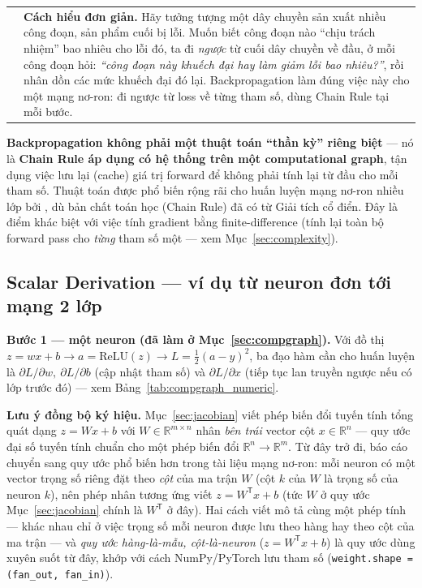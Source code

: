 \documentclass[12pt,a4paper]{report}
\makeatletter
\newenvironment{tructiep}[1][Cách hiểu đơn giản]
  {\par\smallskip\noindent\begin{tabular}{@{}p{0.35em}@{\hspace{6pt}}p{\dimexpr\linewidth-1.9em\relax}@{}}
   \textcolor{boxln}{\rule{2pt}{\baselineskip}} & \textbf{#1.}\enspace\ignorespaces}
  {\end{tabular}\par\smallskip}
\newcommand{\T}{^{\mathsf{T}}}
\makeatother
\begin{document}
\begin{tructiep}
Hãy tưởng tượng một dây chuyền sản xuất nhiều công đoạn, sản phẩm cuối bị
lỗi. Muốn biết công đoạn nào ``chịu trách nhiệm'' bao nhiêu cho lỗi đó, ta đi
\emph{ngược} từ cuối dây chuyền về đầu, ở mỗi công đoạn hỏi: \emph{``công
đoạn này khuếch đại hay làm giảm lỗi bao nhiêu?''}, rồi nhân dồn các mức
khuếch đại đó lại. Backpropagation làm đúng việc này cho một mạng nơ-ron:
đi ngược từ loss về từng tham số, dùng Chain Rule tại mỗi bước.
\end{tructiep}

\textbf{Backpropagation không phải một thuật toán ``thần kỳ'' riêng biệt} ---
nó là \textbf{Chain Rule áp dụng có hệ thống trên một computational graph},
tận dụng việc lưu lại (cache) giá trị forward để không phải tính lại từ
đầu cho mỗi tham số. Thuật toán được phổ biến rộng rãi cho huấn luyện mạng
nơ-ron nhiều lớp bởi \citet{rumelhart1986learning}, dù bản chất toán học
(Chain Rule) đã có từ Giải tích cổ điển. Đây là điểm khác biệt với việc
tính gradient bằng finite-difference (tính lại toàn bộ forward pass cho
\emph{từng} tham số một --- xem Mục~\ref{sec:complexity}).

\subsection{Scalar Derivation --- ví dụ từ neuron đơn tới mạng 2 lớp}
\label{sec:scalar}

\textbf{Bước 1 --- một neuron (đã làm ở Mục~\ref{sec:compgraph}).} Với đồ
thị $z=wx+b \to a=\mathrm{ReLU}(z) \to L=\tfrac12(a-y)^2$, ba đạo hàm cần
cho huấn luyện là $\partial L/\partial w,\ \partial L/\partial b$ (cập nhật
tham số) và $\partial L/\partial x$ (tiếp tục lan truyền ngược nếu có lớp
trước đó) --- xem Bảng~\ref{tab:compgraph_numeric}.

\textbf{Lưu ý đồng bộ ký hiệu.} Mục~\ref{sec:jacobian} viết phép biến đổi
tuyến tính tổng quát dạng $z=Wx+b$ với $W\in\mathbb R^{m\times n}$ nhân
\emph{bên trái} vector cột $x\in\mathbb R^n$ --- quy ước đại số tuyến tính
chuẩn cho một phép biến đổi $\mathbb R^n\to\mathbb R^m$. Từ đây trở đi,
báo cáo chuyển sang quy ước phổ biến hơn trong tài liệu mạng nơ-ron: mỗi
neuron có một vector trọng số riêng đặt theo \emph{cột} của ma trận $W$
(cột $k$ của $W$ là trọng số của neuron $k$), nên phép nhân tương ứng viết
$z=W\T x+b$ (tức $W$ ở quy ước Mục~\ref{sec:jacobian} chính là $W\T$ ở đây).
Hai cách viết mô tả cùng một phép tính --- khác nhau chỉ ở việc trọng số
mỗi neuron được lưu theo hàng hay theo cột của ma trận --- và \emph{quy
ước hàng-là-mẫu, cột-là-neuron} ($z=W\T x+b$) là quy ước dùng xuyên suốt
từ đây, khớp với cách NumPy/PyTorch lưu tham số (\texttt{weight.shape =
(fan\_out, fan\_in)}).
\end{document}
